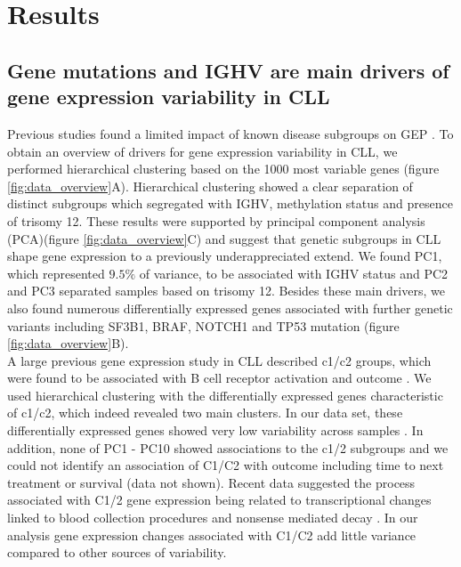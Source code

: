 

\section{Results}


\subsection{Gene mutations and IGHV are main drivers of gene expression variability in CLL} 
Previous studies found a limited impact of known disease subgroups on GEP \citep{ Rosenwald2001}. To obtain an overview of  drivers for gene expression variability in CLL, we performed hierarchical clustering based on the 1000 most variable genes (figure \ref {fig:data_overview}A). Hierarchical clustering showed a clear separation of distinct subgroups which segregated with IGHV, methylation status and presence of trisomy 12.  These results were supported by principal component analysis (PCA)(figure \ref {fig:data_overview}C) and suggest that genetic subgroups in CLL shape gene expression to a previously underappreciated extend. We found PC1, which represented $9.5 \%$ of variance, to be associated with IGHV status and PC2 and PC3 separated samples based on trisomy 12. Besides these main drivers, we also found numerous differentially expressed genes associated with further genetic variants including SF3B1, BRAF, NOTCH1 and TP53 mutation (figure \ref {fig:data_overview}B).\\

A large  previous gene expression study in CLL described c1/c2 groups, which were found to be associated with B cell receptor activation and outcome \citep{Ferreira2014a}. We used hierarchical clustering with the differentially expressed genes characteristic of c1/c2, which indeed revealed two main clusters. In our data set, these differentially expressed genes showed very low variability across samples . In addition, none of PC1 - PC10 showed associations to the c1/2 subgroups and we could not identify an association of C1/C2 with outcome including time to next treatment or survival (data not shown). Recent data suggested the process associated with C1/2 gene expression being related to transcriptional changes linked to blood collection procedures and nonsense mediated decay \citep{Dvinge2014}. In our analysis gene expression changes associated with C1/C2 add little variance compared to other sources of variability.  


